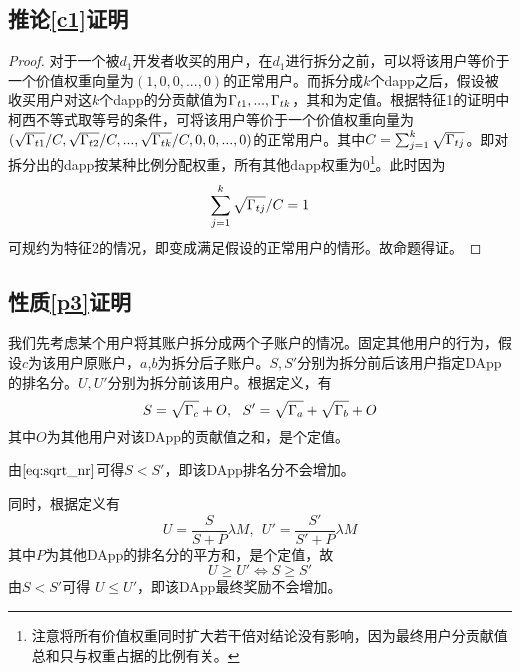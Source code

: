 \subsection{推论\ref{c1}证明}
\label{subsection:proof3}
\begin{proof}
	对于一个被$d_1$开发者收买的用户，在$d_1$进行拆分之前，可以将该用户等价于一个价值权重向量为$(1,0,0,...,0)$的正常用户。而拆分成$k$个dapp之后，假设被收买用户对这$k$个dapp的分贡献值为$\Gamma_{t1},...,\Gamma_{tk}$，其和为定值。根据特征1的证明中柯西不等式取等号的条件，可将该用户等价于一个价值权重向量为$(\sqrt{\Gamma_{t1}}/C,\sqrt{\Gamma_{t2}}/C,...,\sqrt{\Gamma_{tk}}/C,0,0,...,0)$的正常用户。其中$C=\sum_{j=1}^k \sqrt{\Gamma_{tj}}$。即对拆分出的dapp按某种比例分配权重，所有其他dapp权重为0\footnote{注意将所有价值权重同时扩大若干倍对结论没有影响，因为最终用户分贡献值总和只与权重占据的比例有关。}。此时因为
	$$\sum_{j=1}^k \sqrt{\Gamma_{tj}}/C =1$$
	可规约为特征2的情况，即变成满足假设的正常用户的情形。故命题得证。
\end{proof}

\subsection{性质\ref{p3}证明}
我们先考虑某个用户将其账户拆分成两个子账户的情况。固定其他用户的行为，假设$c$为该用户原账户，$a$,$b$为拆分后子账户。$S,S'$分别为拆分前后该用户指定DApp的排名分。$U,U'$分别为拆分前该用户。根据定义，有
$$S= \sqrt{\Gamma_c}+O,~~S'=\sqrt{\Gamma_a}+\sqrt{\Gamma_b}+O$$
其中$O$为其他用户对该DApp的贡献值之和，是个定值。

由$\ref{eq:sqrt_nr}$可得$S < S'$，即该DApp排名分不会增加。

同时，根据定义有
$$U = \frac{S}{S+P}\lambda M,~~U' = \frac{S'}{S'+P} \lambda M$$
其中$P$为其他DApp的排名分的平方和，是个定值，故
$$U \geq U' \Leftrightarrow S \geq S'$$
由$S < S' $可得 $U \leq U'$，即该DApp最终奖励不会增加。

